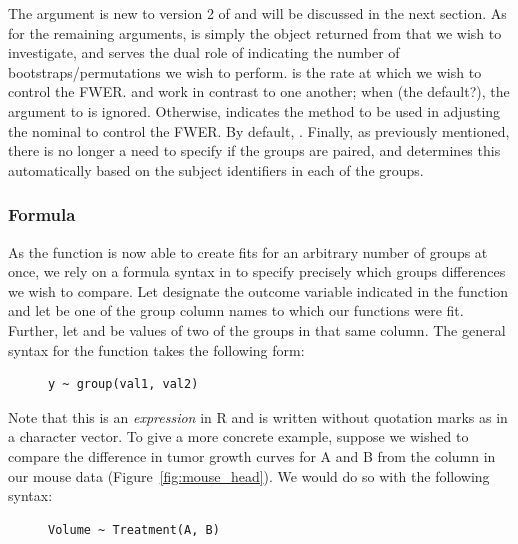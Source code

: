 The  argument is new to version 2 of  and will be discussed in the next section. As for the remaining arguments,  is simply the object returned from  that we wish to investigate, and  serves the dual role of indicating the number of bootstraps/permutations we wish to perform.  is the rate at which we wish to control the FWER.  and  work in contrast to one another; when  (the default?), the argument to  is ignored. Otherwise,  indicates the method to be used in adjusting the nominal  to control the FWER. By default, . Finally, as previously mentioned, there is no longer a need to specify if the groups are paired, and  determines this automatically based on the subject identifiers in each of the groups.


\subsubsection{Formula}

As the  function is now able to create fits for an arbitrary number of groups at once, we rely on a formula syntax in  to specify precisely which groups differences we wish to compare. Let designate the outcome variable indicated in the  function and let  be one of the group column names to which our functions were fit. Further, let  and  be values of two of the groups in that same column. The general syntax for the  function takes the following form:

\begin{singlespace}
\begin{figure}[H]
\centering
\begin{BVerbatim}
y ~ group(val1, val2)
\end{BVerbatim}
\end{figure}
\end{singlespace}

Note that this is an \textit{expression} in R and is written without quotation marks as in a character vector. To give a more concrete example, suppose we wished to compare the difference in tumor growth curves for A and B from the  column in our mouse data (Figure~\ref{fig:mouse_head}). We would do so with the following syntax:

\begin{singlespace}
\begin{figure}[H]
\centering
\begin{BVerbatim}
Volume ~ Treatment(A, B)
\end{BVerbatim}
\end{figure}
\end{singlespace}

